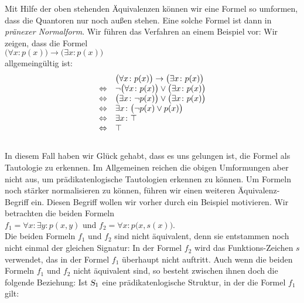Mit Hilfe der oben stehenden \"{A}quivalenzen k\"{o}nnen wir eine Formel so umformen, dass die Quantoren nur
noch au\ss{}en stehen.  Eine solche Formel ist dann in {\emph{\color{blue}pr\"{a}nexer Normalform}}.  Wir f\"{u}hren
das Verfahren an einem Beispiel vor: Wir zeigen, dass die Formel 
\\[0.2cm]
\hspace*{1.3cm}
$\big(\forall x\colon p(x)\big) \rightarrow \big(\exists x\colon p(x)\big)$ 
\\[0.2cm]
allgemeing\"{u}ltig ist: 
$$ 
\begin{array}{ll}
                 & \big(\forall x\colon p(x)\big) \rightarrow \big(\exists x\colon p(x)\big)  \\
 \Leftrightarrow & \neg \big(\forall x\colon p(x)\big) \vee \big(\exists x\colon p(x)\big)    \\
 \Leftrightarrow & \big(\exists x\colon \neg p(x)\big) \vee \big(\exists x\colon p(x)\big)    \\
 \Leftrightarrow & \exists x\colon \bigl(\neg p(x) \vee p(x)\bigr) \\
 \Leftrightarrow & \exists x\colon \top                                                  \\
 \Leftrightarrow & \top                                                  \\
\end{array}
$$
\\[0.2cm]
In diesem Fall haben wir Gl\"{u}ck gehabt, dass es uns gelungen ist, die Formel als Tautologie zu
erkennen.  Im Allgemeinen reichen die obigen Umformungen aber nicht aus, um pr\"{a}dikatenlogische
Tautologien erkennen zu k\"{o}nnen.
Um Formeln noch st\"{a}rker normalisieren zu k\"{o}nnen, 
f\"{u}hren wir einen weiteren
\"{A}quivalenz-Begriff ein.  Diesen Begriff wollen wir vorher durch ein Beispiel motivieren.
Wir betrachten die beiden Formeln \\[0.2cm]
\hspace*{1.3cm} $f_1 = \forall x \colon \exists y \colon p(x,y)$ \quad und \quad $f_2 = \forall x \colon p\bigl(x,s(x)\bigr)$.\\[0.2cm]
Die beiden Formeln $f_1$ und $f_2$ sind nicht \"{a}quivalent, denn sie entstammen noch nicht
einmal der gleichen Signatur: In der Formel $f_2$ wird das Funktions-Zeichen $s$
verwendet, das in der Formel $f_1$ \"{u}berhaupt nicht auftritt. 
Auch wenn die beiden Formeln $f_1$ und $f_2$ nicht \"{a}quivalent sind, so besteht zwischen
ihnen doch die folgende Beziehung:  Ist $\textsl{S}_1$ eine
pr\"{a}dikatenlogische Struktur, in der die Formel $f_1$ gilt:
